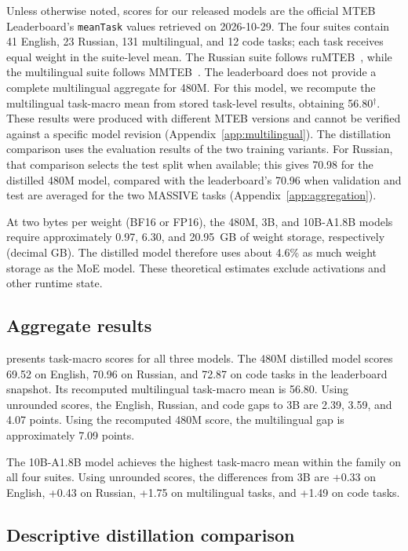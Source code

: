 \documentclass[11pt]{article}
\begin{document}
Unless otherwise noted, scores for our released models are the official MTEB Leaderboard's \texttt{meanTask} values retrieved on 2026-10-29.
The four suites contain 41 English, 23 Russian, 131 multilingual, and 12 code tasks; each task receives equal weight in the suite-level mean.
The Russian suite follows ruMTEB~\citep{snegirev2025rumteb}, while the multilingual suite follows MMTEB~\citep{enevoldsen2025mmteb}.
The leaderboard does not provide a complete multilingual aggregate for 480M.
For this model, we recompute the multilingual task-macro mean from stored task-level results, obtaining 56.80$^{\dagger}$.
These results were produced with different MTEB versions and cannot be verified against a specific model revision (Appendix~\ref{app:multilingual}).
The distillation comparison uses the evaluation results of the two training variants.
For Russian, that comparison selects the test split when available; this gives 70.98 for the distilled 480M model, compared with the leaderboard's 70.96 when validation and test are averaged for the two MASSIVE tasks (Appendix~\ref{app:aggregation}).

At two bytes per weight (BF16 or FP16), the 480M, 3B, and 10B-A1.8B models require approximately 0.97, 6.30, and 20.95~GB of weight storage, respectively (decimal GB).
The distilled model therefore uses about 4.6\% as much weight storage as the MoE model.
These theoretical estimates exclude activations and other runtime state.

\subsection{Aggregate results}

 presents task-macro scores for all three models.
The 480M distilled model scores 69.52 on English, 70.96 on Russian, and 72.87 on code tasks in the leaderboard snapshot.
Its recomputed multilingual task-macro mean is 56.80.
Using unrounded scores, the English, Russian, and code gaps to 3B are 2.39, 3.59, and 4.07 points.
Using the recomputed 480M score, the multilingual gap is approximately 7.09 points.

The 10B-A1.8B model achieves the highest task-macro mean within the family on all four suites.
Using unrounded scores, the differences from 3B are +0.33 on English, +0.43 on Russian, +1.75 on multilingual tasks, and +1.49 on code tasks.

\subsection{Descriptive distillation comparison}
\end{document}
